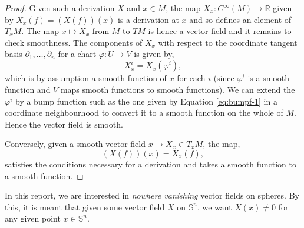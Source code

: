 \documentclass[12pt,a4paper]{article}
\begin{document}
\begin{proof}
Given such a derivation $X$ and $x\in M$, the map $X_x:C^{\infty}(M)\to\mathbb{R}$ given by $X_x(f)=(X(f))(x)$ is a derivation at $x$ and so defines an element of $T_xM$. The map $x\mapsto X_x$ from $M$ to $TM$ is hence a vector field and it remains to check smoothness. The components of $X_x$ with respect to the coordinate tangent basis $\partial_1,\ldots,\partial_n$ for a chart $\varphi:U\to V$ is given by,
\[
X_x^i=X_x(\varphi^i),
\]
which is by assumption a smooth function of $x$ for each $i$ (since $\varphi^i$ is a smooth function and $V$ maps smooth functions to smooth functions). We can extend the $\varphi^i$ by a bump function such as the one given by Equation \eqref{eq:bumpf-1} in a coordinate neighbourhood to convert it to a smooth function on the whole of $M$. Hence the vector field is smooth.

Conversely, given a smooth vector field $x\mapsto X_x\in T_xM$, the map,
\[
(X(f))(x)=X_x(f),
\] 
satisfies the conditions necessary for a derivation and takes a smooth function to a smooth function.
%
\end{proof}
\begin{remark}
In this report, we are interested in \textit{nowhere vanishing} vector fields on spheres. By this, it is meant that given some vector field $X$ on $\mathbb{S}^n$, we want $X(x)\neq 0$ for any given point $x\in\mathbb{S}^n$.
\end{remark}
\end{document}
